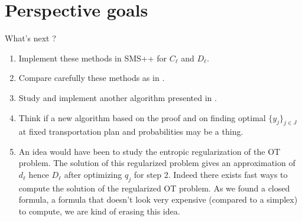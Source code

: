 \documentclass{beamer}
\theoremstyle{plain}
\begin{document}
\section{Perspective goals}
\begin{frame}{What's next ?}
    \begin{enumerate}
        \item \alert{Implement} these methods in SMS++ for $C_\ell$ and $D_\ell$.
        \item \alert{Compare} carefully these methods as in \cite{rujeerapaiboon_scenario_2022}.
        \item Study and implement \alert{another algorithm} presented in \cite{bertsimas_optimization-based_2023}.
        \item Think if a \alert{new algorithm} based on the proof and on finding optimal $\{y_j\}_{j\in J}$ at fixed transportation plan and probabilities may be a thing.
        \item An idea would have been to study \alert{the entropic regularization of the OT problem}. The solution of this regularized problem gives an approximation of $d_\ell$ hence $D_\ell$ after optimizing $q_j$ for step 2. Indeed there exists \alert{fast ways to compute the solution} of the regularized OT problem. As we found a closed formula, a formula that doesn't look very expensive (compared to a simplex) to compute, we are kind of erasing this idea.   
    \end{enumerate}
\end{frame}


\end{document}
